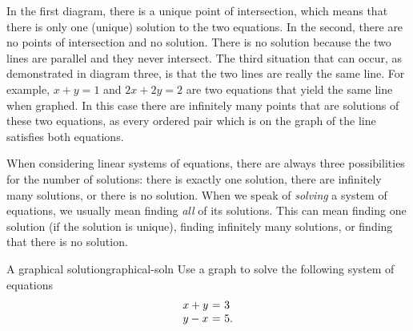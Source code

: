 In the first diagram, there is a unique point of
intersection, which means that there is only one (unique) solution to the two equations. 
In the second, there are no points of intersection and  no solution. There is no solution because the two lines are parallel and they never intersect.
The third situation that can occur, as demonstrated in diagram three, is that the two lines are really the same line. For
example, $x+y=1$ and $2x+2y=2$ are two equations that yield the
same line when graphed. In this case there are infinitely many points that are
solutions of these two equations, as every ordered pair which is on the graph of
the line satisfies both equations. 

When considering linear systems of equations, there are always three
possibilities for the number of solutions: there is exactly one
solution, there are infinitely many solutions, or there is no
solution.  When we speak of {\em solving} a system of equations, we
usually mean finding {\em all} of its solutions. This can mean finding
one solution (if the solution is unique), finding infinitely many
solutions, or finding that there is no solution.

\begin{example}{A graphical solution}{graphical-soln}
Use a graph to solve the following system of equations \:
\begin{equation*}
\begin{array}{r@{~}c@{~}l}
x+y&=&3 \\
y-x&=&5.
\end{array}
\end{equation*}
\end{example} 

